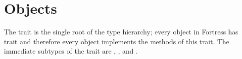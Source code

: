 %
%
%
%

\chapter{Objects}


The trait  is the single root of the type hierarchy; every
object in Fortress has trait  and therefore every object
implements the methods of this trait.  The immediate subtypes of the trait
 are , , and \TYP{()}.

